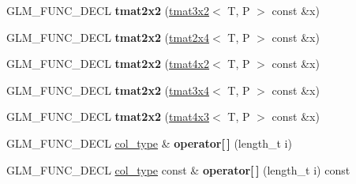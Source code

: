 \begin{DoxyCompactItemize}
\item 
G\+L\+M\+\_\+\+F\+U\+N\+C\+\_\+\+D\+E\+CL {\bfseries tmat2x2} (\hyperlink{structglm_1_1detail_1_1tmat3x2}{tmat3x2}$<$ T, P $>$ const \&x)\hypertarget{structglm_1_1detail_1_1tmat2x2_a4f224e4deddcbcd9f4b3109b595429e6}{}\label{structglm_1_1detail_1_1tmat2x2_a4f224e4deddcbcd9f4b3109b595429e6}

\item 
G\+L\+M\+\_\+\+F\+U\+N\+C\+\_\+\+D\+E\+CL {\bfseries tmat2x2} (\hyperlink{structglm_1_1detail_1_1tmat2x4}{tmat2x4}$<$ T, P $>$ const \&x)\hypertarget{structglm_1_1detail_1_1tmat2x2_ad9aa5899db04b6c8d78d31ebea8ea4c6}{}\label{structglm_1_1detail_1_1tmat2x2_ad9aa5899db04b6c8d78d31ebea8ea4c6}

\item 
G\+L\+M\+\_\+\+F\+U\+N\+C\+\_\+\+D\+E\+CL {\bfseries tmat2x2} (\hyperlink{structglm_1_1detail_1_1tmat4x2}{tmat4x2}$<$ T, P $>$ const \&x)\hypertarget{structglm_1_1detail_1_1tmat2x2_a124fb38aa5a54a8c912e5612b69aabd8}{}\label{structglm_1_1detail_1_1tmat2x2_a124fb38aa5a54a8c912e5612b69aabd8}

\item 
G\+L\+M\+\_\+\+F\+U\+N\+C\+\_\+\+D\+E\+CL {\bfseries tmat2x2} (\hyperlink{structglm_1_1detail_1_1tmat3x4}{tmat3x4}$<$ T, P $>$ const \&x)\hypertarget{structglm_1_1detail_1_1tmat2x2_a197a18fc9c265eb65da1bc0df80224cf}{}\label{structglm_1_1detail_1_1tmat2x2_a197a18fc9c265eb65da1bc0df80224cf}

\item 
G\+L\+M\+\_\+\+F\+U\+N\+C\+\_\+\+D\+E\+CL {\bfseries tmat2x2} (\hyperlink{structglm_1_1detail_1_1tmat4x3}{tmat4x3}$<$ T, P $>$ const \&x)\hypertarget{structglm_1_1detail_1_1tmat2x2_ad9dc3f0b215226f11ba9214e456f69ec}{}\label{structglm_1_1detail_1_1tmat2x2_ad9dc3f0b215226f11ba9214e456f69ec}

\item 
G\+L\+M\+\_\+\+F\+U\+N\+C\+\_\+\+D\+E\+CL \hyperlink{structglm_1_1detail_1_1tvec2}{col\+\_\+type} \& {\bfseries operator\mbox{[}$\,$\mbox{]}} (length\+\_\+t i)\hypertarget{structglm_1_1detail_1_1tmat2x2_a3eccfee40595e7b8023755e5d41ed0fe}{}\label{structglm_1_1detail_1_1tmat2x2_a3eccfee40595e7b8023755e5d41ed0fe}

\item 
G\+L\+M\+\_\+\+F\+U\+N\+C\+\_\+\+D\+E\+CL \hyperlink{structglm_1_1detail_1_1tvec2}{col\+\_\+type} const \& {\bfseries operator\mbox{[}$\,$\mbox{]}} (length\+\_\+t i) const \hypertarget{structglm_1_1detail_1_1tmat2x2_af48c3a162bf1db72b989af5e5619d1d6}{}\label{structglm_1_1detail_1_1tmat2x2_af48c3a162bf1db72b989af5e5619d1d6}


\end{DoxyCompactItemize}

